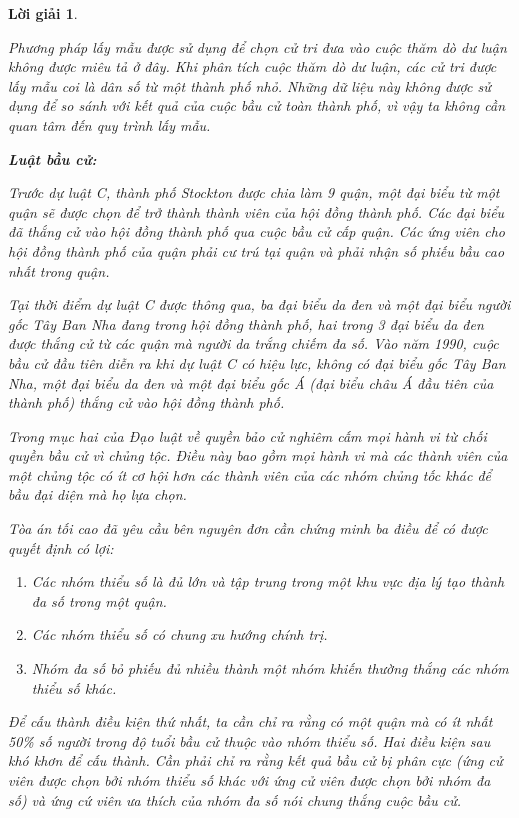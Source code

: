 \documentclass[14pt, a4paper]{article}
\theoremstyle{sltheorem}
\theoremstyle{soltheorem}
\newtheorem*{loigiai}{Lời giải}
\begin{document}
\begin{loigiai}
\begin{enumerate}
        Phương pháp lấy mẫu được sử dụng để chọn cử tri đưa vào cuộc thăm dò dư luận không được miêu tả ở đây.
        Khi phân tích cuộc thăm dò dư luận, các cử tri được lấy mẫu coi là dân số từ một thành phố nhỏ.
        Những dữ liệu này không được sử dụng để so sánh với kết quả của cuộc bầu cử toàn thành phố, vì vậy ta không cần quan tâm đến quy trình lấy mẫu.

        \textbf{Luật bầu cử:}

        Trước dự luật C, thành phố Stockton được chia làm 9 quận, một đại biểu từ một quận sẽ được chọn để trở thành thành viên của hội đồng thành phố.
        Các đại biểu đã thắng cử vào hội đồng thành phố qua cuộc bầu cử cấp quận.
        Các ứng viên cho hội đồng thành phố của quận phải cư trú tại quận và phải nhận số phiếu bầu cao nhất trong quận.

        Tại thời điểm dự luật C được thông qua, ba đại biểu da đen và một đại biểu người gốc Tây Ban Nha đang trong hội đồng thành phố,
        hai trong 3 đại biểu da đen được thắng cử từ các quận mà người da trắng chiếm đa số.
        Vào năm 1990, cuộc bầu cử đầu tiên diễn ra khi dự luật C có hiệu lực, không có đại biểu gốc Tây Ban Nha, một đại biểu da đen và một đại biểu gốc Á (đại biểu châu Á đầu tiên của thành phố) thắng cử vào hội đồng thành phố.

        Trong mục hai của Đạo luật về quyền bảo cử nghiêm cấm mọi hành vi từ chối quyền bầu cử vì chủng tộc.
        Điều này bao gồm mọi hành vi mà các thành viên của một chủng tộc có ít cơ hội hơn các thành viên của các nhóm chủng tốc khác để bầu đại diện mà họ lựa chọn.

        Tòa án tối cao đã yêu cầu bên nguyên đơn cần chứng minh ba điều để có được quyết định có lợi:

        \begin{enumerate}
            \item Các nhóm thiểu số là đủ lớn và tập trung trong một khu vực địa lý tạo thành đa số trong một quận.
            \item Các nhóm thiểu số có chung xu hướng chính trị.
            \item Nhóm đa số bỏ phiếu đủ nhiều thành một nhóm khiến thường thắng các nhóm thiểu số khác.
        \end{enumerate}

        Để cấu thành điều kiện thứ nhất, ta cần chỉ ra rằng có một quận mà có ít nhất 50\% số người trong độ tuổi bầu cử thuộc vào nhóm thiểu số.
        Hai điều kiện sau khó khơn để cấu thành.
        Cần phải chỉ ra rằng kết quả bầu cử bị phân cực (ứng cử viên được chọn bởi nhóm thiểu số khác với ứng cử viên được chọn bởi nhóm đa số) và ứng cứ viên ưa thích của nhóm đa số nói chung thắng cuộc bầu cử.


\end{enumerate}
\end{loigiai}
\end{document}
